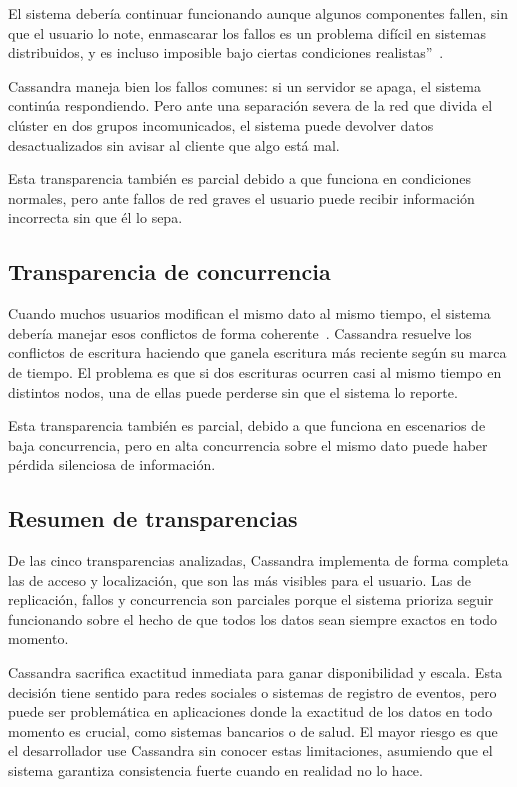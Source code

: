\documentclass[12pt, a4paper]{article}
\begin{document}
El sistema debería continuar funcionando aunque algunos componentes
fallen, sin que el usuario lo note, enmascarar los fallos es un problema difícil en sistemas distribuidos, y es incluso imposible bajo ciertas condiciones
realistas''~\cite{tanenbaum2007}.

Cassandra maneja bien los fallos comunes: si un servidor se apaga,
el sistema continúa respondiendo. Pero ante una separación severa de
la red que divida el clúster en dos grupos incomunicados, el sistema
puede devolver datos desactualizados sin avisar al cliente que algo
está mal.

Esta transparencia también es parcial debido a que funciona en condiciones
normales, pero ante fallos de red graves el usuario puede recibir
información incorrecta sin que él lo sepa.

\subsection{Transparencia de concurrencia}

Cuando muchos usuarios modifican el mismo dato al mismo tiempo, el
sistema debería manejar esos conflictos de forma coherente~\cite{tanenbaum2007}.
Cassandra resuelve los conflictos de escritura haciendo que ganela escritura más reciente según su marca de tiempo. El problema
es que si dos escrituras ocurren casi al mismo tiempo en distintos
nodos, una de ellas puede perderse sin que el sistema lo reporte.

Esta transparencia también es parcial, debido a que funciona en escenarios de baja
concurrencia, pero en alta concurrencia sobre el mismo dato puede
haber pérdida silenciosa de información.

\subsection{Resumen de transparencias}

De las cinco transparencias analizadas, Cassandra implementa de forma
completa las de acceso y localización, que son las más visibles para
el usuario. Las de replicación, fallos y concurrencia son parciales
porque el sistema prioriza seguir funcionando sobre el hecho de que
todos los datos sean siempre exactos en todo momento.

Cassandra sacrifica exactitud inmediata para ganar disponibilidad y escala. Esta decisión
tiene sentido para redes sociales o sistemas de registro de eventos,
pero puede ser problemática en aplicaciones donde la exactitud de
los datos en todo momento es crucial, como sistemas bancarios o de
salud. El mayor riesgo es que el desarrollador use Cassandra sin
conocer estas limitaciones, asumiendo que el sistema
garantiza consistencia fuerte cuando en realidad no lo hace.
\end{document}
